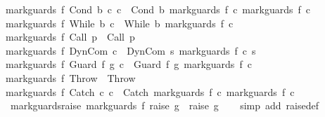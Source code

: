 \begin{isabellebody}
{\isachardoublequoteopen}mark{\isacharunderscore}guards\ f\ {\isacharparenleft}Cond\ b\ c\ c\ {\isacharequal}\ Cond\ b\ {\isacharparenleft}mark{\isacharunderscore}guards\ f\ c\ {\isacharparenleft}mark{\isacharunderscore}guards\ f\ c\ {\isacharbar}\isanewline
{\isachardoublequoteopen}mark{\isacharunderscore}guards\ f\ {\isacharparenleft}While\ b\ c{\isacharparenright}\ {\isacharequal}\ While\ b\ {\isacharparenleft}mark{\isacharunderscore}guards\ f\ c{\isacharparenright}{\isachardoublequoteclose}\ {\isacharbar}\isanewline
{\isachardoublequoteopen}mark{\isacharunderscore}guards\ f\ {\isacharparenleft}Call\ p{\isacharparenright}\ {\isacharequal}\ Call\ p{\isachardoublequoteclose}\ {\isacharbar}\isanewline
{\isachardoublequoteopen}mark{\isacharunderscore}guards\ f\ {\isacharparenleft}DynCom\ c{\isacharparenright}\ {\isacharequal}\ DynCom\ {\isacharparenleft}{\isasymlambda}s{\isachardot}\ {\isacharparenleft}mark{\isacharunderscore}guards\ f\ {\isacharparenleft}c\ s{\isacharparenright}{\isacharparenright}{\isacharparenright}{\isachardoublequoteclose}\ {\isacharbar}\isanewline
{\isachardoublequoteopen}mark{\isacharunderscore}guards\ f\ {\isacharparenleft}Guard\ f{\isacharprime}\ g\ c{\isacharparenright}\ {\isacharequal}\ Guard\ f\ g\ {\isacharparenleft}mark{\isacharunderscore}guards\ f\ c{\isacharparenright}{\isachardoublequoteclose}\ {\isacharbar}\isanewline
{\isachardoublequoteopen}mark{\isacharunderscore}guards\ f\ Throw\ {\isacharequal}\ Throw{\isachardoublequoteclose}\ {\isacharbar}\isanewline
{\isachardoublequoteopen}mark{\isacharunderscore}guards\ f\ {\isacharparenleft}Catch\ c\ c\ {\isacharequal}\ Catch\ {\isacharparenleft}mark{\isacharunderscore}guards\ f\ c\ {\isacharparenleft}mark{\isacharunderscore}guards\ f\ c\isanewline
\isanewline
{}\isamarkupfalse%
\ mark{\isacharunderscore}guards{\isacharunderscore}raise{\isacharcolon}\ {\isachardoublequoteopen}mark{\isacharunderscore}guards\ f\ {\isacharparenleft}raise\ g{\isacharparenright}\ {\isacharequal}\ raise\ g{\isachardoublequoteclose}\isanewline
%
\isadelimproof
\ \ %
\endisadelimproof
%
\isatagproof
{}\isamarkupfalse%
\ {\isacharparenleft}simp\ add{\isacharcolon}\ raise{\isacharunderscore}def{\isacharparenright}%

\end{isabellebody}
